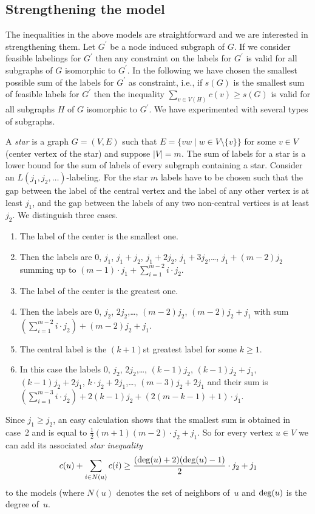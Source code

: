 \documentclass[smallextended]{svjour3}
\def\deg{\mathop{\rm deg}}
\begin{document}
\subsection{Strengthening the model} 

The inequalities in the above models are straightforward and we are 
interested in strengthening them. Let $G^\prime$ be a node induced subgraph of $G$. 
If we consider feasible labelings for $G^\prime$ then any constraint on the 
labels for $G^\prime$ is valid for all subgraphs of $G$ isomorphic to $G^\prime$. 
In the following we have chosen the smallest possible sum of the labels 
for $G^\prime$ as constraint, i.e., if $s(G)$ is the smallest sum of 
feasible labels for $G^\prime$ then the inequality $\sum_{v\in V(H)}c(v)\geq s(G)$ 
is valid for all subgraphs $H$ of $G$ isomorphic to $G^\prime$. 
We have experimented with several types of subgraphs. 

A \emph{star} is a graph $G=(V,E)$ such that $E=\{vw\mid w\in V\setminus\{v\}\}$ for some $v\in V$ 
(center vertex of the star) and suppose $|V|=m$. 
The sum of labels for a star is a lower bound for the sum of labels of every subgraph 
containing a star. Consider an $L(j_1,j_2,\ldots)$-labeling. For the star $m$ labels have 
to be chosen such that the gap between the label 
of the central vertex and the label of any other vertex is at least 
$j_1$, and the gap between the labels of any two non-central vertices 
is at least $j_2$. We distinguish three cases. 
\begin{enumerate} 
\item 
The label of the center is the smallest one. 
\item[]Then the labels are 0, $j_1$, 
$j_1+j_2$, $j_1+2j_2$, $j_1+3j_2$,\ldots , $j_1+(m-2)j_2$ 
summing up to $(m-1)\cdot j_1+\sum_{i=1}^{m-2}i\cdot j_2$. 
\item 
The label of the center is the greatest one. 
\item[]Then the labels are 0, $j_2$, 
$2j_2$,\ldots , $(m-2)j_2$, $(m-2)j_2+j_1$ with sum 
$(\sum_{i=1}^{m-2}i\cdot j_2)+(m-2)j_2+j_1$. 
\item 
The central label is the $(k+1)$st greatest label for some $k\ge1$. 
\item[]In this case the labels 0, $j_2$, 
$2j_2$,\ldots , $(k-1)j_2$, $(k-1)j_2+j_1$, $(k-1)j_2+2j_1$, 
$k\cdot j_2+2j_1$,\ldots , $(m-3)j_2+2j_1$ and their sum is 
$(\sum_{i=1}^{m-3}i\cdot j_2)+2(k-1)j_2+(2(m-k-1)+1)\cdot j_1$. 
\end{enumerate} 
Since $j_1\geq j_2$, an easy calculation shows that the smallest sum is obtained 
in case~2 and is equal to $\frac{1}{2}(m+1)(m-2)\cdot j_2+j_1$. 
So for every vertex $u\in V$ we can add its associated \emph{star inequality} 
\[ 
c(u)+\sum_{i\in N(u)}c(i)\geq\frac{(\deg(u)+2)(\deg(u)-1)}{2}\cdot j_2+j_1 
\] 
to the models (where $N(u)$ denotes the set of neighbors of~$u$ 
and $\deg(u)$ is the degree of~$u$. 
\end{document}
